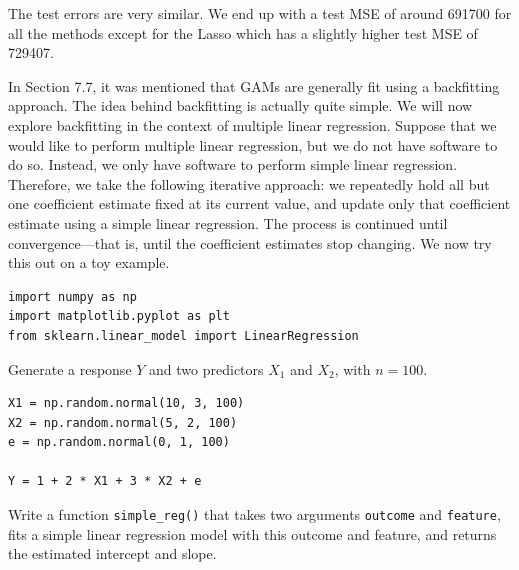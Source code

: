 \documentclass{article}
\begin{document}
\begin{probset}
\begin{prob}
\begin{subprobset}
\begin{subprob}[g]
            \begin{soln}
                The test errors are very similar. We end up with a test MSE of around 691700 for all the methods except for the Lasso which has a slightly higher test MSE of 729407.
            \end{soln}
        \end{subprob}
    \end{subprobset}
\end{prob}

\newpage

\begin{prob}
    In Section 7.7, it was mentioned that GAMs are generally fit using a backfitting approach. The idea behind backfitting is actually quite simple. We will now explore backfitting in the context of multiple linear regression. Suppose that we would like to perform multiple linear regression, but we do not have software to do so. Instead, we only have software to perform simple linear regression. Therefore, we take the following iterative approach: we repeatedly hold all but one coefficient estimate fixed at its current value, and update only that coefficient estimate using a simple linear regression. The process is continued until convergence—that is, until the coefficient estimates stop changing. We now try this out on a toy example.

    \begin{verbatim}
import numpy as np
import matplotlib.pyplot as plt
from sklearn.linear_model import LinearRegression
\end{verbatim}

    \begin{subprobset}
        \begin{subprob}
            Generate a response $Y$ and two predictors $X_1$ and $X_2$, with $n = 100$.

            \begin{verbatim}
X1 = np.random.normal(10, 3, 100)
X2 = np.random.normal(5, 2, 100)
e = np.random.normal(0, 1, 100)

Y = 1 + 2 * X1 + 3 * X2 + e
            \end{verbatim}
        \end{subprob}

        \begin{subprob}
            Write a function \texttt{simple\_reg()} that takes two arguments \texttt{outcome} and \texttt{feature}, fits a simple linear regression model with this outcome and feature, and returns the estimated intercept and slope.


\end{subprob}
\end{subprobset}
\end{prob}
\end{probset}
\end{document}
